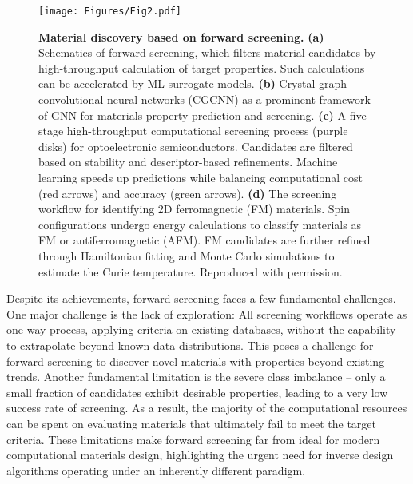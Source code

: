\documentclass[fleqn,10pt]{wlscirep}
\begin{document}
\begin{figure}[!htbp]
    \centering
    \texttt{[image: Figures/Fig2.pdf]}
    \caption{\textbf{Material discovery based on forward screening.} \textbf{(a)} Schematics of forward screening, which filters material candidates by high-throughput calculation of target properties. Such calculations can be accelerated by ML surrogate models. \textbf{(b)} Crystal graph convolutional neural networks (CGCNN) as a prominent framework of GNN for materials property prediction and screening\cite{xie2018crystal}. \textbf{(c)} A five-stage high-throughput computational screening process (purple disks) for optoelectronic semiconductors\cite{luo2021high}. Candidates are filtered based on stability and descriptor-based refinements. Machine learning speeds up predictions while balancing computational cost (red arrows) and accuracy (green arrows). \textbf{(d)} The screening workflow for identifying 2D ferromagnetic (FM) materials\cite{kabiraj2020high}. Spin configurations undergo energy calculations to classify materials as FM or antiferromagnetic (AFM). FM candidates are further refined through Hamiltonian fitting and Monte Carlo simulations to estimate the Curie temperature. Reproduced with permission\cite{xie2018crystal,luo2021high,kabiraj2020high}.}
    \label{fig2}
\end{figure}

Despite its achievements, forward screening faces a few fundamental challenges. One major challenge is the lack of exploration: All screening workflows operate as one-way process, applying criteria on existing databases, without the capability to extrapolate beyond known data distributions. This poses a challenge for forward screening to discover novel materials with properties beyond existing trends. 
Another fundamental limitation is the severe class imbalance -- only a small fraction of candidates exhibit desirable properties, leading to a very low success rate of screening. As a result, the majority of the computational resources can be spent on evaluating materials that ultimately fail to meet the target criteria. These limitations make forward screening far from ideal for modern computational materials design, highlighting the urgent need for inverse design algorithms operating under an inherently different paradigm.
\end{document}
